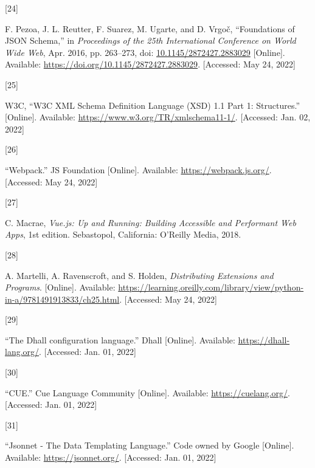 \documentclass[
  a4paper,
  bibtex,
  english,
  nomenclature]{kthlatex/kththesis/kththesis}
\newlength{\cslhangindent}
\newlength{\csllabelwidth}
\newlength{\cslentryspacingunit} %
\newenvironment{CSLReferences}[2] %
 {%
  \setlength{\parindent}{0pt}
  \ifodd #1
  \let\oldpar\par
  \def\par{\hangindent=\cslhangindent\oldpar}
  \fi
  \setlength{\parskip}{#2\cslentryspacingunit}
 }%
 {}
\newcommand{\CSLLeftMargin}[1]{\parbox[t]{\csllabelwidth}{#1}}
\newcommand{\CSLRightInline}[1]{\parbox[t]{\linewidth - \csllabelwidth}{#1}\break}
\begin{document}
\begin{CSLReferences}{0}{0}
\leavevmode{}%
\CSLLeftMargin{{[}24{]} }
\CSLRightInline{F. Pezoa, J. L. Reutter, F. Suarez, M. Ugarte, and D.
Vrgoč, {``Foundations of {JSON Schema},''} in \emph{Proceedings of the
25th {International Conference} on {World Wide Web}}, Apr. 2016, pp.
263--273, doi:
\href{https://doi.org/10.1145/2872427.2883029}{10.1145/2872427.2883029}
{[}Online{]}. Available: \url{https://doi.org/10.1145/2872427.2883029}.
{[}Accessed: May 24, 2022{]}}

\leavevmode{}%
\CSLLeftMargin{{[}25{]} }
\CSLRightInline{W3C, {``{W3C XML Schema Definition Language} ({XSD}) 1.1
{Part} 1: {Structures}.''} {[}Online{]}. Available:
\url{https://www.w3.org/TR/xmlschema11-1/}. {[}Accessed: Jan. 02,
2022{]}}

\leavevmode{}%
\CSLLeftMargin{{[}26{]} }
\CSLRightInline{{``Webpack.''} JS Foundation {[}Online{]}. Available:
\url{https://webpack.js.org/}. {[}Accessed: May 24, 2022{]}}

\leavevmode{}%
\CSLLeftMargin{{[}27{]} }
\CSLRightInline{C. Macrae, \emph{Vue.js: {Up} and {Running}: {Building
Accessible} and {Performant Web Apps}}, 1st edition. {Sebastopol,
California}: {O'Reilly Media}, 2018. }

\leavevmode{}%
\CSLLeftMargin{{[}28{]} }
\CSLRightInline{A. Martelli, A. Ravenscroft, and S. Holden,
\emph{Distributing {Extensions} and {Programs}}. {[}Online{]}.
Available:
\url{https://learning.oreilly.com/library/view/python-in-a/9781491913833/ch25.html}.
{[}Accessed: May 24, 2022{]}}

\leavevmode{}%
\CSLLeftMargin{{[}29{]} }
\CSLRightInline{{``The {Dhall} configuration language.''} Dhall
{[}Online{]}. Available: \url{https://dhall-lang.org/}. {[}Accessed:
Jan. 01, 2022{]}}

\leavevmode{}%
\CSLLeftMargin{{[}30{]} }
\CSLRightInline{{``{CUE}.''} Cue Language Community {[}Online{]}.
Available: \url{https://cuelang.org/}. {[}Accessed: Jan. 01, 2022{]}}

\leavevmode{}%
\CSLLeftMargin{{[}31{]} }
\CSLRightInline{{``Jsonnet - {The Data Templating Language}.''} Code
owned by Google {[}Online{]}. Available: \url{https://jsonnet.org/}.
{[}Accessed: Jan. 01, 2022{]}}


\end{CSLReferences}
\end{document}

